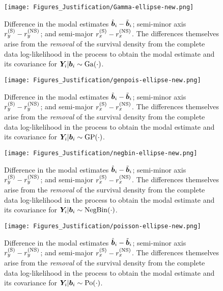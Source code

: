 \begin{figure}[ht]
    \centering
    \texttt{[image: Figures\_Justification/Gamma-ellipse-new.png]}
    \caption{Difference in the modal estimates $\hat{\bm{b}}_i-\tilde{\bm{b}}_i$; semi-minor axis $r_y^{(\mathrm{S})}-r_y^{(\mathrm{NS})}$; and semi-major $r_x^{(\mathrm{S})}-r_x^{(\mathrm{NS})}$. The differences themselves arise from the \textit{removal} of the survival density from the complete data log-likelihood in the process to obtain the modal estimate and its covariance for $\bm{Y}_i|\bm{b}_i\sim\mathrm{Ga}\!\left(\cdot\right)$.}
    \label{fig:appendix-justification-ellipse-gamma}
\end{figure}

\begin{figure}[ht]
    \centering
    \texttt{[image: Figures\_Justification/genpois-ellipse-new.png]}
    \caption{Difference in the modal estimates $\hat{\bm{b}}_i-\tilde{\bm{b}}_i$; semi-minor axis $r_y^{(\mathrm{S})}-r_y^{(\mathrm{NS})}$; and semi-major $r_x^{(\mathrm{S})}-r_x^{(\mathrm{NS})}$. The differences themselves arise from the \textit{removal} of the survival density from the complete data log-likelihood in the process to obtain the modal estimate and its covariance for $\bm{Y}_i|\bm{b}_i\sim\mathrm{GP}\!\left(\cdot\right)$.}
    \label{fig:appendix-justification-ellipse-genpois}
\end{figure}

\begin{figure}[ht]
    \centering
    \texttt{[image: Figures\_Justification/negbin-ellipse-new.png]}
    \caption{Difference in the modal estimates $\hat{\bm{b}}_i-\tilde{\bm{b}}_i$; semi-minor axis $r_y^{(\mathrm{S})}-r_y^{(\mathrm{NS})}$; and semi-major $r_x^{(\mathrm{S})}-r_x^{(\mathrm{NS})}$. The differences themselves arise from the \textit{removal} of the survival density from the complete data log-likelihood in the process to obtain the modal estimate and its covariance for $\bm{Y}_i|\bm{b}_i\sim\mathrm{NegBin}\!\left(\cdot\right)$.}
    \label{fig:appendix-justification-ellipse-negbin}
\end{figure}

\begin{figure}[ht]
    \centering
    \texttt{[image: Figures\_Justification/poisson-ellipse-new.png]}
    \caption{Difference in the modal estimates $\hat{\bm{b}}_i-\tilde{\bm{b}}_i$; semi-minor axis $r_y^{(\mathrm{S})}-r_y^{(\mathrm{NS})}$; and semi-major $r_x^{(\mathrm{S})}-r_x^{(\mathrm{NS})}$. The differences themselves arise from the \textit{removal} of the survival density from the complete data log-likelihood in the process to obtain the modal estimate and its covariance for $\bm{Y}_i|\bm{b}_i\sim\mathrm{Po}\!\left(\cdot\right)$.}
    \label{fig:appendix-justification-ellipse-poisson}
\end{figure}

